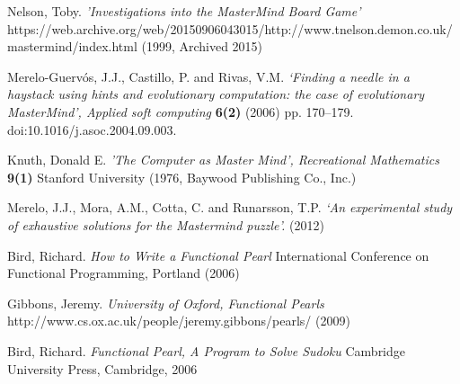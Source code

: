 \documentclass[12pt]{article}  %
\theoremstyle{definition}
\theoremstyle{remark}
\begin{document}
\begin{thebibliography}{99}
Nelson, Toby.
{\em 'Investigations into the MasterMind Board Game'}
https://web.archive.org/web/20150906043015/http://www.tnelson.demon.co.uk/mastermind/index.html
(1999, Archived 2015)

Merelo-Guervós, J.J., Castillo, P. and Rivas, V.M. 
{\em ‘Finding a needle in a haystack using hints and evolutionary computation: the case of evolutionary MasterMind’, Applied soft computing}
{\bf  6(2)}
(2006) pp. 170–179. 
doi:10.1016/j.asoc.2004.09.003.

Knuth, Donald E. 
{\em 'The Computer as Master Mind', Recreational Mathematics}
{\bf 9(1)}
Stanford University
(1976, Baywood Publishing Co., Inc.)

 Merelo, J.J., Mora, A.M., Cotta, C. and Runarsson, T.P. 
{\em ‘An experimental study of exhaustive solutions for the Mastermind puzzle’.}
(2012) 

Bird, Richard.
{\em How to Write a Functional Pearl}
International Conference on Functional Programming, Portland
(2006)

Gibbons, Jeremy.
{\em University of Oxford, Functional Pearls}
http://www.cs.ox.ac.uk/people/jeremy.gibbons/pearls/
(2009)

Bird, Richard.
{\em Functional Pearl, A Program to Solve Sudoku}
Cambridge University Press, Cambridge, 2006



\end{thebibliography}
\end{document}
